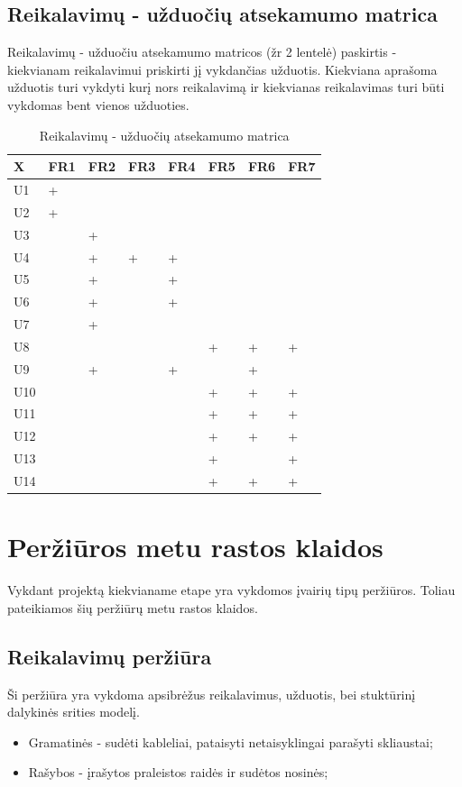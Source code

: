 \documentclass{VUMIFPSkursinis}
\begin{document}
	\subsection{Reikalavimų - užduočių atsekamumo matrica}\label{strukturinisDSModelis_matrica}
		Reikalavimų - užduočiu atsekamumo matricos (žr 2 lentelė) paskirtis - kiekvianam reikalavimui
		priskirti jį vykdančias užduotis. Kiekviana aprašoma užduotis turi vykdyti kurį nors reikalavimą ir
		kiekvianas reikalavimas turi būti vykdomas bent vienos užduoties.
\begin{table}[H]\footnotesize
  \centering
  \caption{Reikalavimų - užduočių atsekamumo matrica}
  \resizebox{\textwidth}{!}
  {\begin{tabular}{|l| l| l| l| l| l| l| l|} \hline
    	X		& FR1		& FR2		& FR3		& FR4		& FR5		& FR6		& FR7\\
\hline
	U1		&+		&		&		&		&		&		&\\
\hline
	U2		&+		&		&		&		&		&		&\\
\hline
	U3		&		&+		&		&		&		&		&\\
\hline
	U4		&		&+		&+		&+		&		&		&\\
\hline
	U5		&		&+		&		&+		&		&		&\\
\hline
	U6		&		&+		&		&+		&		&		&\\
\hline
	U7		&		&+		&		&		&		&		&\\
\hline
	U8		&		&		&		&		&+		&+		&+\\
\hline
	U9		&		&+		&		&+		&		&+		&\\
\hline
	U10		&		&		&		&		&+		&+		&+\\
\hline
	U11		&		&		&		&		&+		&+		&+\\
\hline
	U12		&		&		&		&		&+		&+		&+\\
\hline
	U13		&		&		&		&		&+		&		&+\\
\hline
	U14		&		&		&		&		&+		&+		&+\\
\hline
  \end{tabular}}
  \label{tab:table example}
\end{table}

\section{Peržiūros metu rastos klaidos}
	Vykdant projektą kiekvianame etape yra vykdomos įvairių tipų peržiūros.
	Toliau pateikiamos šių peržiūrų metu rastos klaidos.
	\subsection{Reikalavimų peržiūra}
		Ši peržiūra yra vykdoma apsibrėžus reikalavimus, užduotis, bei stuktūrinį dalykinės srities modelį.
		\begin{itemize}
			\item Gramatinės - sudėti kableliai, pataisyti netaisyklingai parašyti skliaustai;
			\item Rašybos - įrašytos praleistos raidės ir sudėtos nosinės;
		\end{itemize}
\end{document}
